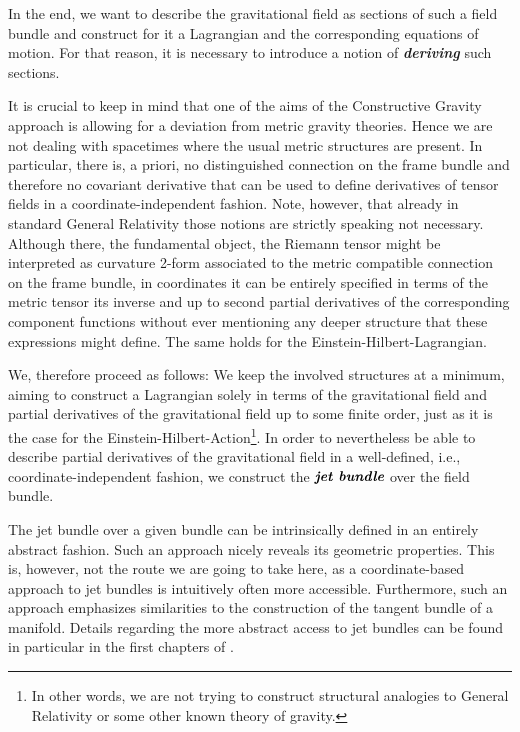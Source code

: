 In the end, we want to describe the gravitational field as sections of such a field bundle and construct for it a Lagrangian and the corresponding equations of motion. For that reason, it is necessary to introduce a notion of \textit{\textbf{deriving}} such sections. 

It is crucial to keep in mind that one of the aims of the Constructive Gravity approach is allowing for a deviation from metric gravity theories. Hence we are not dealing with spacetimes where the usual metric structures are present. In particular, there is, a priori, no distinguished connection on the frame bundle and therefore no covariant derivative that can be used to define derivatives of tensor fields in a coordinate-independent fashion. Note, however, that already in standard General Relativity those notions are strictly speaking not necessary. Although there, the fundamental object, the Riemann tensor might be interpreted as curvature 2-form associated to the metric compatible connection on the frame bundle, in coordinates it can be entirely specified in terms of the metric tensor its inverse and up to second partial derivatives of the corresponding component functions without ever mentioning any deeper structure that these expressions might define. The same holds for the Einstein-Hilbert-Lagrangian. 

We, therefore proceed as follows: We keep the involved structures at a minimum, aiming to construct a Lagrangian solely in terms of the gravitational field and partial derivatives of the gravitational field up to some finite order, just as it is the case for the Einstein-Hilbert-Action\footnote{In other words, we are not trying to construct structural analogies to General Relativity or some other known theory of gravity.}. In order to nevertheless be able to describe partial derivatives of the gravitational field in a well-defined, i.e., coordinate-independent fashion, we construct the $\textit{\textbf{jet bundle}}$ over the field bundle.

The jet bundle over a given bundle can be intrinsically defined in an entirely abstract fashion. Such an approach nicely reveals its geometric properties. This is, however, not the route we are going to take here, as a coordinate-based approach to jet bundles is intuitively often more accessible. Furthermore, such an approach emphasizes similarities to the construction of the tangent bundle of a manifold. Details regarding the more abstract access to jet bundles can be found in particular in the first chapters of \cite{seiler2009involution}. 

